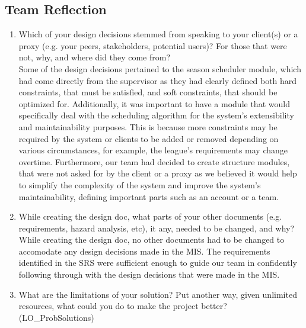 \documentclass[12pt, titlepage]{article}
\begin{document}
\subsection*{Team Reflection}

  \begin{enumerate}
    \item Which of your design decisions stemmed from speaking to your client(s)
    or a proxy (e.g. your peers, stakeholders, potential users)? For those that
    were not, why, and where did they come from?\\

    Some of the design decisions pertained to the season scheduler module, which had come directly from
    the supervisor as they had clearly defined both hard constraints, that must be satisfied, and
    soft constraints, that should be optimized for. Additionally, it was important to have a
    module that would specifically deal with the scheduling algorithm for the system's extensibility and
    maintainability purposes. This is because more constraints may be required by the system
    or clients to be added or removed depending on various circumstances, for example, the league's
    requirements may change overtime. Furthermore, our team had decided to create structure modules,
    that were not asked for by the client or a proxy as we believed it would help to simplify the
    complexity of the system and improve the system's maintainability, defining important parts
    such as an account or a team.\\
    
    \item While creating the design doc, what parts of your other documents (e.g.
    requirements, hazard analysis, etc), it any, needed to be changed, and why?\\
    
    While creating the design doc, no other documents had to be changed to accomodate any
    design decisions made in the MIS. The requirements identified in the SRS were sufficient
    enough to guide our team in confidently following through with the design decisions that
    were made in the MIS.\\
    
    \item What are the limitations of your solution?  Put another way, given
    unlimited resources, what could you do to make the project better? (LO\_ProbSolutions)\\
    

\end{enumerate}
\end{document}
